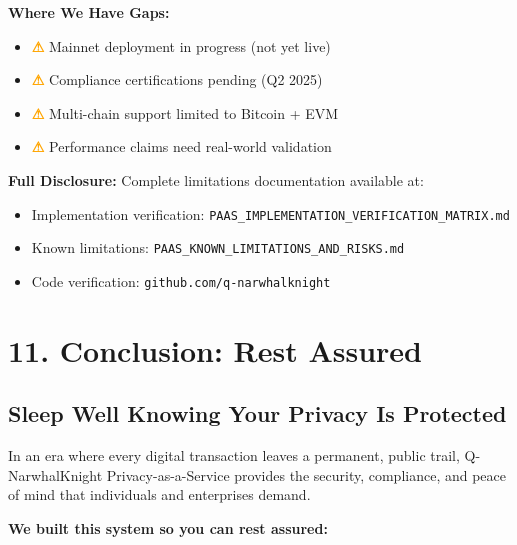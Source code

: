 \documentclass[11pt,a4paper]{article}
\begin{document}
\textbf{Where We Have Gaps:}
\begin{itemize}
    \item \textcolor{orange}{\textbf{⚠}} Mainnet deployment in progress (not yet live)
    \item \textcolor{orange}{\textbf{⚠}} Compliance certifications pending (Q2 2025)
    \item \textcolor{orange}{\textbf{⚠}} Multi-chain support limited to Bitcoin + EVM
    \item \textcolor{orange}{\textbf{⚠}} Performance claims need real-world validation
\end{itemize}

\vspace{0.5cm}
\noindent
\textbf{Full Disclosure:} Complete limitations documentation available at:
\begin{itemize}
    \item Implementation verification: \texttt{PAAS\_IMPLEMENTATION\_VERIFICATION\_MATRIX.md}
    \item Known limitations: \texttt{PAAS\_KNOWN\_LIMITATIONS\_AND\_RISKS.md}
    \item Code verification: \texttt{github.com/q-narwhalknight}
\end{itemize}

\section{11. Conclusion: Rest Assured}

\subsection{Sleep Well Knowing Your Privacy Is Protected}

In an era where every digital transaction leaves a permanent, public trail, Q-NarwhalKnight Privacy-as-a-Service provides the security, compliance, and peace of mind that individuals and enterprises demand.

\textbf{We built this system so you can rest assured:}
\end{document}
